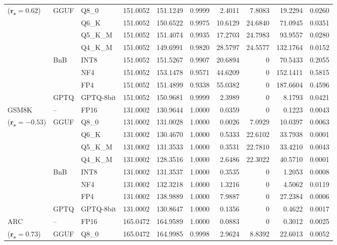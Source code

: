 \begin{longtable}{ll l rrrrrrr}
{\small ($\mathbf{r_s{=}0.62}$)} & GGUF & Q8\_0 & 151.0052 & 151.1249 & 0.9999 & 2.4011 & 7.8083 & 19.2294 & 0.0260 \\
 &  & Q6\_K & 151.0052 & 150.6522 & 0.9975 & 10.6129 & 24.6840 & 71.0945 & 0.0351 \\
 &  & Q5\_K\_M & 151.0052 & 151.4074 & 0.9935 & 17.2703 & 24.7983 & 93.9557 & 0.0280 \\
 &  & Q4\_K\_M & 151.0052 & 149.6991 & 0.9820 & 28.5797 & 24.5577 & 132.1764 & 0.0152 \\
 & BnB & INT8 & 151.0052 & 151.5267 & 0.9907 & 20.6894 & \cellcolor{cyan!12} $0$ & 70.5433 & 0.2055 \\
 &  & NF4 & 151.0052 & 153.1478 & 0.9571 & 44.6209 & \cellcolor{cyan!12} $0$ & 152.1411 & 0.5815 \\
 &  & FP4 & 151.0052 & 151.4899 & \cellcolor{red!18} 0.9338 & \cellcolor{red!18} 55.0382 & \cellcolor{cyan!12} $0$ & \cellcolor{red!18} 187.6604 & \cellcolor{red!18} 0.4596 \\
 & GPTQ & GPTQ-8bit & 151.0052 & 150.9681 & 0.9999 & 2.3989 & \cellcolor{cyan!12} $0$ & 8.1793 & 0.0421 \\
\midrule
GSM8K & -- & FP16 & 131.0002 & 130.9644 & 1.0000 & 0.0359 & \cellcolor{cyan!12} $0$ & 0.1223 & 0.0043 \\
{\small ($\mathbf{r_s{=}-0.53}$)} & GGUF & Q8\_0 & 131.0002 & 131.0028 & 1.0000 & 0.0026 & 7.0929 & 10.0397 & 0.0063 \\
 &  & Q6\_K & 131.0002 & 130.4670 & 1.0000 & 0.5333 & 22.6102 & 33.7938 & 0.0001 \\
 &  & Q5\_K\_M & 131.0002 & 131.3533 & 1.0000 & 0.3531 & 22.7810 & 33.4210 & 0.0043 \\
 &  & Q4\_K\_M & 131.0002 & 128.3516 & 1.0000 & 2.6486 & 22.3022 & 40.5710 & 0.0001 \\
 & BnB & INT8 & 131.0002 & 131.3537 & 1.0000 & 0.3535 & \cellcolor{cyan!12} $0$ & 1.2053 & 0.0008 \\
 &  & NF4 & 131.0002 & 132.3218 & 1.0000 & 1.3216 & \cellcolor{cyan!12} $0$ & 4.5062 & 0.0119 \\
 &  & FP4 & 131.0002 & 138.9889 & 1.0000 & 7.9887 & \cellcolor{cyan!12} $0$ & 27.2384 & 0.0006 \\
 & GPTQ & GPTQ-8bit & 131.0002 & 130.8647 & 1.0000 & 0.1356 & \cellcolor{cyan!12} $0$ & 0.4622 & 0.0017 \\
\midrule
ARC & -- & FP16 & 165.0472 & 164.9589 & 1.0000 & 0.0883 & \cellcolor{cyan!12} $0$ & 0.3012 & 0.0025 \\
{\small ($\mathbf{r_s{=}0.73}$)} & GGUF & Q8\_0 & 165.0472 & 164.9985 & 0.9998 & 2.9624 & 8.8392 & 22.6013 & 0.0052 \\

\end{longtable}
